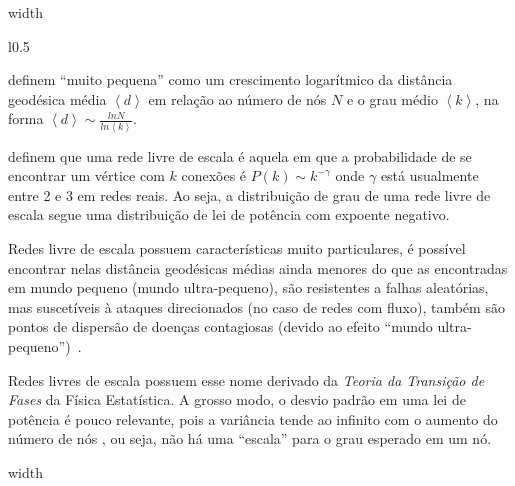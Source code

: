 \documentclass[10pt,a4paper,final]{article}
\newcommand\disappearingrule{%
  \par %
  \vskip10pt %
  \leaders\vrule width \textwidth\vskip0.4pt %
  \nointerlineskip %
  \vskip10pt %
}
\newcommand{\avg}[1]{\left\langle #1 \right\rangle} %
\begin{document}
\disappearingrule

\begin{minipage}[t]{\linewidth}
  \begin{wrapfigure}{l}{0.5\textwidth}
  \end{wrapfigure}

   definem \enquote{muito pequena} como um crescimento logarítmico da distância geodésica média $\avg{d}$ em relação ao número de nós $N$ e o grau médio $\avg{k}$, na forma $\avg{d} \sim \frac{ln N}{ln \avg{k}}$.
  
   definem que uma rede livre de escala é aquela em que a probabilidade de se encontrar um vértice com $k$ conexões é $P(k) \sim k^{-\gamma}$ onde $\gamma$ está usualmente entre 2 e 3 em redes reais. Ao seja, a distribuição de grau de uma rede livre de escala segue uma distribuição de lei de potência com expoente negativo.
  
  Redes livre de escala possuem características muito particulares, é possível encontrar nelas distância geodésicas médias ainda menores do que as encontradas em mundo pequeno (mundo ultra-pequeno), são resistentes a falhas aleatórias, mas suscetíveis à ataques direcionados (no caso de redes com fluxo), também são pontos de dispersão de doenças contagiosas (devido ao efeito \enquote{mundo ultra-pequeno})~\cite{Barabasi2016-rn}. 
  
  Redes livres de escala possuem esse nome derivado da \textit{Teoria da Transição de Fases} da Física Estatística. A grosso modo, o desvio padrão em uma lei de potência é pouco relevante, pois a variância tende ao infinito com o aumento do número de nós \cite[pág. 122]{Barabasi2016-rn}, ou seja, não há uma \enquote{escala} para o grau esperado em um nó.
\end{minipage}

\disappearingrule
\end{document}
